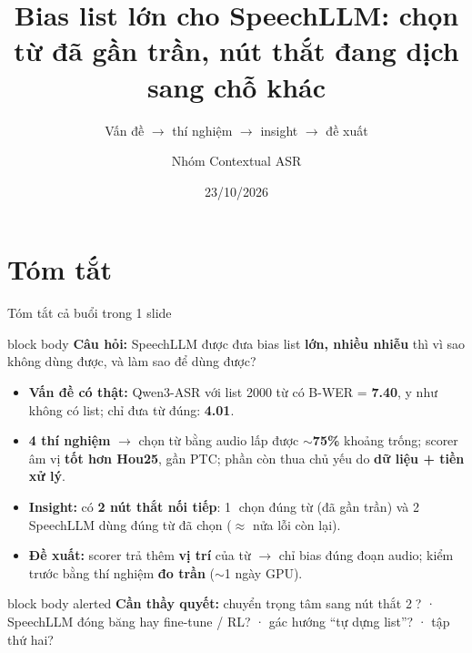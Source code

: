 \documentclass[aspectratio=169,xcolor=table]{beamer}
\title{Bias list lớn cho SpeechLLM: chọn từ đã gần trần, nút thắt đang dịch sang chỗ khác}
\subtitle{Vấn đề $\rightarrow$ thí nghiệm $\rightarrow$ insight $\rightarrow$ đề xuất}
\author{Nhóm Contextual ASR}
\institute{}
\date{23/10/2026}
\newcommand{\hi}[1]{\textcolor{Primary}{\textbf{#1}}}
\newcommand{\bad}[1]{\textcolor{RiskRed}{\textbf{#1}}}
\newcommand{\good}[1]{\textcolor{GoodGreen}{\textbf{#1}}}
\newcommand{\ra}{$\rightarrow$}
\begin{document}
\begin{frame}[plain]\titlepage\end{frame}

\section{Tóm tắt}
\begin{frame}{Tóm tắt cả buổi trong 1 slide}
\begin{beamercolorbox}[sep=0.55em,rounded=true]{block body}
\textbf{Câu hỏi:} SpeechLLM được đưa bias list \textbf{lớn, nhiều nhiễu} thì vì sao không dùng được, và làm sao để dùng được?
\end{beamercolorbox}
\vspace{0.1cm}
\small
\begin{itemize}\itemsep2pt
\item \textbf{Vấn đề có thật:} Qwen3-ASR với list 2000 từ có B-WER = \bad{7.40}, y như không có list; chỉ đưa từ đúng: \good{4.01}.
\item \textbf{4 thí nghiệm} \ra{} chọn từ bằng audio lấp được \good{$\sim$75\%} khoảng trống; scorer âm vị \textbf{tốt hơn Hou25}, gần PTC; phần còn thua chủ yếu do \textbf{dữ liệu + tiền xử lý}.
\item \textbf{Insight:} có \hi{2 nút thắt nối tiếp}: \textcircled{\scriptsize 1} chọn đúng từ (đã gần trần) và \textcircled{\scriptsize 2} SpeechLLM dùng đúng từ đã chọn ($\approx$ nửa lỗi còn lại).
\item \textbf{Đề xuất:} scorer trả thêm \hi{vị trí} của từ \ra{} chỉ bias đúng đoạn audio; kiểm trước bằng thí nghiệm \textbf{đo trần} ($\sim$1 ngày GPU).
\end{itemize}
\begin{beamercolorbox}[sep=0.4em,rounded=true]{block body alerted}
\footnotesize\textbf{Cần thầy quyết:} chuyển trọng tâm sang nút thắt \textcircled{\scriptsize 2}? \;·\; SpeechLLM đóng băng hay fine-tune / RL? \;·\; gác hướng ``tự dựng list''? \;·\; tập thứ hai?
\end{beamercolorbox}
\end{frame}

\end{document}
